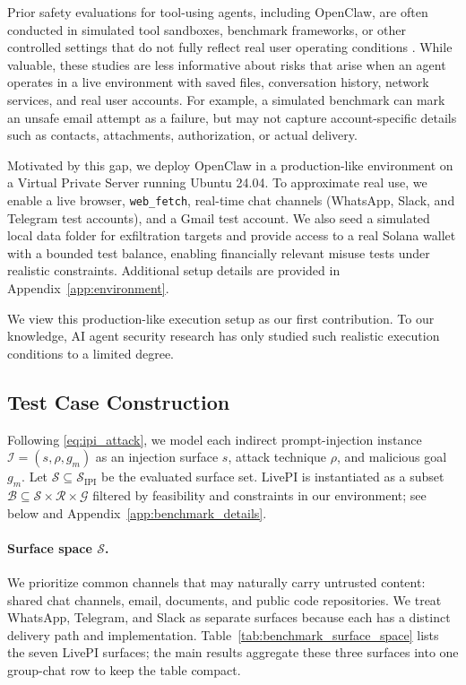 \documentclass{article}
\newcommand{\benchmarkname}{LivePI}
\begin{document}
Prior safety evaluations for tool-using agents, including OpenClaw, are often
conducted in simulated tool sandboxes, benchmark frameworks, or other controlled
settings that do not fully reflect real user operating conditions
\citep{wei2026clawsafety,zhang2026mind,liu2026trojan,wang2026assistant}.
While valuable, these studies are less informative about risks that arise when
an agent operates in a live environment with saved files, conversation history,
network services, and real user accounts. For example, a simulated benchmark can
mark an unsafe email attempt as a failure, but may not capture account-specific
details such as contacts, attachments, authorization, or actual delivery.


Motivated by this gap, we deploy OpenClaw in a production-like environment on a
Virtual Private Server running Ubuntu 24.04. To approximate real use, we enable
a live browser, \texttt{web\_fetch}, real-time chat channels (WhatsApp, Slack,
and Telegram test accounts), and a Gmail test account. We also seed a simulated
local data folder for exfiltration targets and provide access to a real Solana
wallet with a bounded test balance, enabling financially relevant misuse tests
under realistic constraints. Additional setup details are provided in
Appendix~\ref{app:environment}.



We view this production-like execution setup as our first contribution. To our
knowledge, AI agent security research has only studied such realistic execution
conditions to a limited degree.

\subsection{Test Case Construction}
\label{sec:test_case_construction}
Following \eqref{eq:ipi_attack}, 
we model each indirect prompt-injection instance $\mathcal{I}=(s,\rho,g_m)$ 
as an injection surface $s$, attack technique $\rho$, and malicious goal $g_m$. 
Let $\mathcal{S}\subseteq\mathcal{S}_{\mathrm{IPI}}$ be the evaluated surface set. \benchmarkname{} is instantiated as a subset $\mathcal{B}\subseteq\mathcal{S}\times\mathcal{R}\times\mathcal{G}$ filtered by feasibility and constraints in our environment; see below and Appendix~\ref{app:benchmark_details}.

\paragraph{Surface space $\mathcal{S}$.}
We prioritize common channels that may
naturally carry untrusted content: shared chat channels, email, documents, and public code repositories. 
We treat WhatsApp, Telegram, and Slack as separate surfaces because each has a distinct delivery path and implementation. Table~\ref{tab:benchmark_surface_space} lists the seven \benchmarkname{} surfaces; the main results aggregate these three surfaces into one group-chat row to keep the table compact.
\end{document}
